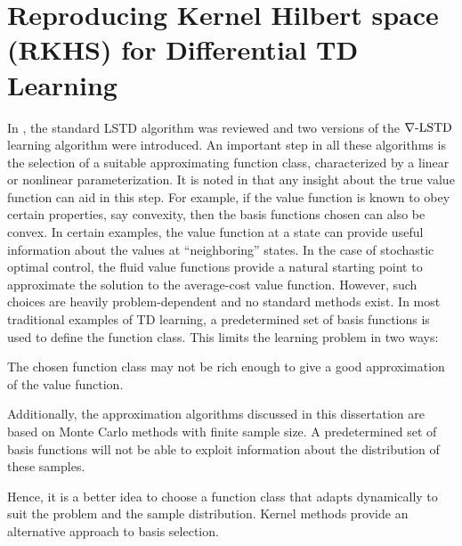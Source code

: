 \chapter{Reproducing Kernel Hilbert space (RKHS) for Differential TD Learning}
\label{ch:rkhs}
In , the standard LSTD algorithm was reviewed and two versions of the $\nabla\text{-LSTD}$ learning algorithm were  introduced. An important step in all these algorithms is the selection of a suitable approximating function class, characterized by  a linear or nonlinear parameterization. It is noted in \cite{ctcn} that any insight about the true value function can aid in this step. For example, if the value function is known to obey certain properties, say convexity, then the basis functions chosen can also be convex.  In certain examples, the value function at a state can provide useful information about the values at ``neighboring'' states. In the case of stochastic optimal control, the fluid value functions provide a natural starting point to approximate the solution to the average-cost value function. However, such choices are heavily problem-dependent and no standard methods exist. In most traditional examples of TD learning, a predetermined set of basis functions is used to define the function class. This limits the learning problem in two ways:
\begin{romannum}
	\item The chosen function class may not be rich enough to give a good approximation of the value function.
	\item Additionally, the approximation algorithms discussed in this dissertation are based on Monte Carlo methods with finite sample size. A predetermined set of basis functions will not be able to exploit information about the distribution of these samples.  
\end{romannum}
Hence, it is a better idea to choose a function class that adapts dynamically to suit the problem and the sample distribution. Kernel methods provide an alternative approach to basis selection. 


